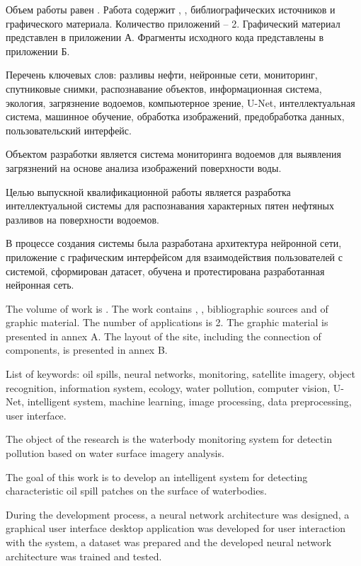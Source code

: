 
Объем работы равен . Работа содержит , ,  библиографических источников и  графического материала. Количество приложений – 2. Графический материал представлен в приложении А. Фрагменты исходного кода представлены в приложении Б.

Перечень ключевых слов: разливы нефти, нейронные сети, мониторинг, спутниковые снимки, распознавание объектов, информационная система, экология, загрязнение водоемов, компьютерное зрение, U-Net, интеллектуальная система, машинное обучение, обработка изображений, предобработка данных, пользовательский интерфейс.

Объектом разработки является система мониторинга водоемов для выявления загрязнений на основе анализа изображений поверхности воды.

Целью выпускной квалификационной работы является разработка интеллектуальной системы для распознавания характерных пятен нефтяных разливов на поверхности водоемов.

В процессе создания системы была разработана архитектура нейронной сети, приложение с графическим интерфейсом для взаимодействия пользователей с системой, сформирован датасет, обучена и протестирована разработанная нейронная сеть.

  
The volume of work is . The work contains , ,  bibliographic sources and  of graphic material. The number of applications is 2. The graphic material is presented in annex A. The layout of the site, including the connection of components, is presented in annex B.

List of keywords: oil spills, neural networks, monitoring, satellite imagery, object recognition, information system, ecology, water pollution, computer vision, U-Net, intelligent system, machine learning, image processing, data preprocessing, user interface.

The object of the research is the waterbody monitoring system for detectin pollution based on water surface imagery analysis.

The goal of this work is to develop an intelligent system for detecting characteristic oil spill patches on the surface of waterbodies.

During the development process, a neural network architecture was designed, a graphical user interface desktop application was developed for user interaction with the system, a dataset was prepared and the developed neural network architecture was trained and tested. 
